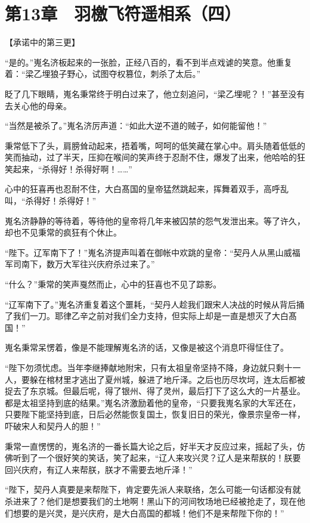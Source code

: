 \section{第13章　羽檄飞符遥相系（四）}

【承诺中的第三更】

“是的。”嵬名济板起来的一张脸，正经八百的，看不到半点戏谑的笑意。他重复着：“梁乙埋狼子野心，试图夺权篡位，刺杀了太后。”

眨了几下眼睛，嵬名秉常终于明白过来了，他立刻追问，“梁乙埋呢？！”甚至没有去关心他的母亲。

“当然是被杀了。”嵬名济厉声道：“如此大逆不道的贼子，如何能留他！”

秉常低下了头，肩膀耸动起来，捂着嘴，呵呵的低笑藏在掌心中。肩头随着低低的笑而抽动，过了半天，压抑在喉间的笑声终于忍耐不住，爆发了出来，他哈哈的狂笑起来，“杀得好！杀得好啊！……”

心中的狂喜再也忍耐不住，大白髙国的皇帝猛然跳起来，挥舞着双手，高呼乱叫，“杀得好！杀得好！”

嵬名济静静的等待着，等待他的皇帝将几年来被囚禁的怨气发泄出来。等了许久，却也不见秉常的疯狂有个休止。

“陛下。辽军南下了！”嵬名济提声叫着在御帐中欢跳的皇帝：“契丹人从黑山威福军司南下，数万大军往兴庆府杀过来了。”

“什么？”秉常的笑声戛然而止，心中的狂喜也不见了踪影。

“辽军南下了。”嵬名济重复着这个噩耗，“契丹人趁我们跟宋人决战的时候从背后捅了我们一刀。耶律乙辛之前对我们全力支持，但实际上却是一直是想灭了大白髙国！”

嵬名秉常呆愣着，像是不能理解嵬名济的话，又像是被这个消息吓得怔住了。

“陛下勿须忧虑。当年李继捧献地附宋，只有太祖皇帝坚持不降，身边就只剩十一人，要躲在棺材里才逃出了夏州城，躲进了地斤泽。之后也历尽坎坷，连太后都被捉去了东京城。但最后呢，得了银州、得了灵州，最后打下了这么大的一片基业。都是太祖坚持到底的结果。”嵬名济激励着他的皇帝，“只要我嵬名家的大军还在，只要陛下能坚持到底，日后必然能恢复国土，恢复旧日的荣光，像景宗皇帝一样，吓破宋人和契丹人的胆！”

秉常一直愣愣的，嵬名济的一番长篇大论之后，好半天才反应过来，摇起了头，仿佛听到了一个很好笑的笑话，笑了起来，“辽人来攻兴灵？辽人是来帮朕的！朕要回兴庆府，有辽人来帮朕，朕才不需要去地斤泽！”

“陛下，契丹人真要是来帮陛下，肯定要先派人来联络，怎么可能一句话都没有就杀进来了？他们是想要我们的土地啊！黑山下的河间牧场地已经被抢走了，现在他们想要的是兴灵，是兴庆府，是大白高国的都城！他们不是来帮陛下你的！”

